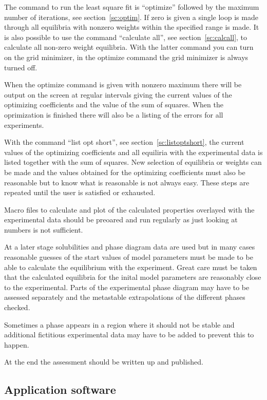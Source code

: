 \documentclass[11pt]{article}
\begin{document}
The command to run the least square fit is ``optimize'' followed by
the maximum number of iterations, see section~\ref{sc:optim}.  If zero
is given a single loop is made through all equilibria with nonzero
weights within the specified range is made.  It is also possible to
use the command ``calculate all'', see section~\ref{sc:calcall}, to
calculate all non-zero weight equilibria.  With the latter command you
can turn on the grid minimizer, in the optimize command the grid
minimizer is always turned off.

When the optimize command is given with nonzero maximum there will be
output on the screen at regular intervals giving the current values of
the optimizing coefficients and the value of the sum of squares.  When
the oprimization is finished there will also be a listing of the
errors for all experiments.

With the command ``list opt short'', see
section~\ref{sc:listoptshort}, the current values of the optimizing
coefficients and all equiliria with the experimental data is listed
together with the sum of squares.  New selection of equilibria or
weights can be made and the values obtained for the optimizing
coefficients must also be reasonable but to know what is reasonable is
not always easy.  These steps are repeated until the user is satisfied
or exhausted.

Macro files to calculate and plot of the calculated properties
overlayed with the experimental data should be preoared and run
regularly as just looking at numbers is not sufficient.

At a later stage solubilities and phase diagram data are used but in
many cases reasonable guesses of the start values of model parameters
must be made to be able to calculate the equilibrium with the
experiment.  Great care must be taken that the calculated equilibria
for the inital model parameters are reasonably close to the
experimental.  Parts of the experimental phase diagram may have to be
assessed separately and the metastable extrapolations of the different
phases checked.

Sometimes a phase appears in a region where it should not be stable
and additional fictitious experimental data may have to be added to
prevent this to happen.

At the end the assessment should be written up and published.

\subsection{Application software}
\end{document}
